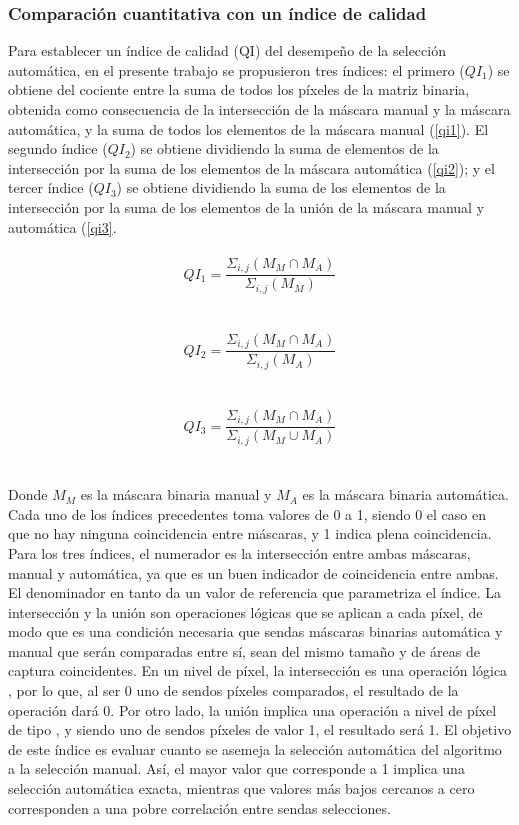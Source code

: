 \subsubsection{Comparación cuantitativa con un índice de calidad}
Para establecer un índice de calidad (QI) del desempeño de la selección automática, en el presente trabajo se propusieron tres índices: el primero ($QI_1$) se obtiene del cociente entre la suma de todos los píxeles de la matriz binaria, obtenida como consecuencia de la intersección de la máscara manual y la máscara automática, y la suma de todos los elementos de la máscara manual (\ref{qi1}). El segundo índice ($QI_2$) se obtiene dividiendo la suma de elementos de la intersección por la suma de los elementos de la máscara automática (\ref{qi2}); y el tercer índice ($QI_3$) se obtiene dividiendo la suma de los elementos de la intersección por la suma de los elementos de la unión de la máscara manual y automática (\ref{qi3}.
\\
\\
 \begin{equation}
    QI_1=\frac{\Sigma _{i,j}(M_M\cap M_A )}{\Sigma _{i,j}(M_M ) }
    \label{qi1}
\end{equation}
\\
\\
 \begin{equation}
    QI_2=\frac{\Sigma _{i,j}(M_M\cap M_A )}{\Sigma _{i,j}(M_A ) }
    \label{qi2}
\end{equation}
\\
\\
\begin{equation}
    QI_3=\frac{\Sigma _{i,j}(M_M\cap M_A )}{\Sigma _{i,j}(M_M \cup M_A ) }
    \label{qi3}
\end{equation}
\\
\\
Donde $M_M$ es la máscara binaria manual y $M_A$ es la máscara binaria automática. Cada uno de los índices precedentes toma valores de 0 a 1, siendo 0 el caso en que no hay ninguna coincidencia entre máscaras, y 1 indica plena coincidencia. Para los tres índices, el numerador es la intersección entre ambas máscaras, manual y automática, ya que es un buen indicador de coincidencia entre ambas. El denominador en tanto da un valor de referencia que parametriza el índice. La intersección y la unión son operaciones lógicas que se aplican a cada píxel, de modo que es una condición necesaria que sendas máscaras binarias automática y manual que serán comparadas entre sí, sean del mismo tamaño y de áreas de captura coincidentes. En un nivel de píxel, la intersección es una operación lógica , por lo que, al ser 0 uno de sendos píxeles comparados, el resultado de la operación dará 0. Por otro lado, la unión implica una operación a nivel de píxel de tipo , y siendo uno de sendos píxeles de valor 1, el resultado será 1. El objetivo de este índice es evaluar cuanto se asemeja la selección automática del algoritmo a la selección manual. Así, el mayor valor que corresponde a 1 implica una selección automática exacta, mientras que valores más bajos cercanos a cero corresponden a una pobre correlación entre sendas selecciones.


